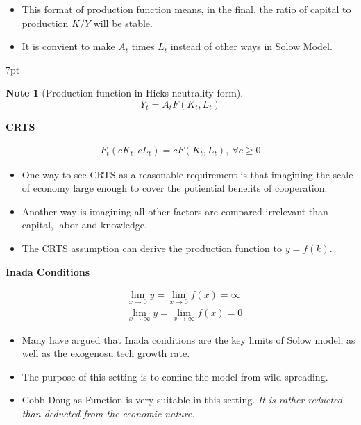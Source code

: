 \documentclass{article}
\providecommand{\tightlist}{
  \setlength{\itemsep}{0pt}
  \setlength{\parskip}{0pt}}
\newenvironment{blueblock}{
\def\FrameCommand{
  \hspace{1pt}
    {\color{DarkBlue}
    \vrule width 2pt}
    {\color{blueshade}
    \vrule width 4pt}
  \colorbox{blueshade}
}
\MakeFramed{
  \advance
  \hsize-
  \width
  \FrameRestore}
\noindent\hspace{-4.55pt}%
\begin{adjustwidth}{}{7pt}
\vspace{2pt}\vspace{2pt}
}
{\vspace{2pt}\end{adjustwidth}\endMakeFramed}
\newtheorem{note}{Note}
\begin{document}
\begin{itemize}
\tightlist
  \item This format of production function means, in the final, the ratio of capital to production $K/Y$ will be stable. 
  \item It is convient to make $A_t$ times $L_t$ instead of other ways in Solow Model.
\end{itemize}

\begin{blueblock}
\begin{note}[Production function in Hicks neutrality form]
$$Y_{t}=A_{t}F(K_{t},L_{t})$$
\end{note}
\end{blueblock}

\textbf{CRTS} 

\begin{align}
F_t(cK_t,cL_t)=cF(K_t,L_t), \: \forall c \geqslant 0
\end{align}

\begin{itemize}
\tightlist
  \item One way to see CRTS as a reasonable requirement is that imagining the scale of economy large enough to cover the potiential benefits of cooperation. 
  \item Another way is imagining all other factors are compared irrelevant than capital, labor and knowledge. 
  \item The CRTS assumption can derive the production function to $y=f(k)$.
\end{itemize}

\textbf{Inada Conditions}

\begin{align}
&\lim\limits_{x \rightarrow 0} y=\lim\limits_{x \rightarrow 0} f(x)= \infty
\\&\lim\limits_{x \rightarrow \infty} y = \lim\limits_{x \rightarrow \infty} f(x)=0
\end{align}

\begin{itemize}
\tightlist
  \item Many have argued that Inada conditions are the key limits of Solow model, as well as the exogenosu tech growth rate. \item The purpose of this setting is to confine the model from wild spreading.
  \item Cobb-Douglas Function is very suitable in this setting. \textit{It is rather reducted than deducted from the economic nature.}
\end{itemize}
\end{document}
